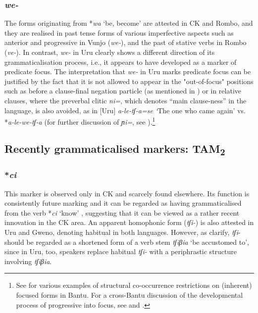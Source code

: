 \documentclass[output=paper]{langscibook}
\begin{document}
\subsubsection{\textit{we-}}\label{sec:shinagawa:3.1.5}

  The forms originating from *\textit{wa} ‘be, become’ are attested in CK and Rombo, and they are realised in past tense forms of various imperfective aspects such as anterior and progressive in Vunjo (\textit{we-}), and the past of stative verbs in Rombo (\textit{ve-}). In contrast, \textit{we-} in Uru clearly shows a different direction of its grammaticalisation process, i.e., it appears to have developed as a marker of predicate focus. The interpretation that \textit{we-} in Uru marks predicate focus can be justified by the fact that it is not allowed to appear in the "out-of-focus" positions such as before a clause-final negation particle (as mentioned in ) or in relative clauses, where the preverbal clitic \textit{ni=}, which denotes “main clause-ness” in the language, is also avoided, as in [Uru] \textit{a-le-tʃ-a=se ‘}The one who came again’ vs. *\textit{a-le-we-tʃ-a} (for further discussion of \textit{ɲi=}, see \citealt{ShinagawaForthcoming-b}).\footnote{See \citet{HymanWatters1984} for various examples of structural co-occurrence restrictions on (inherent) focused forms in Bantu. For a cross-Bantu discussion of the developmental process of progressive into focus, see \citet{Güldemann2003} and \citet{Gibson2019}.}

\subsection{Recently grammaticalised markers: TAM\textsubscript{2}}\label{sec:shinagawa:3.2}
\subsubsection{*\textit{ci}}\label{sec:shinagawa:3.2.1}

  This marker is observed only in CK and scarcely found elsewhere. Its function is consistently future marking and it can be regarded as having grammaticalised from the verb *\textit{ci} ‘know’ \citep[76]{Nurse2003a}, suggesting that it can be viewed as a rather recent innovation in the CK area. An apparent homophonic form (\textit{tʃi-}) is also attested in Uru and Gweno, denoting habitual in both languages. However, as  \citet[255]{PhilippsonNurse2000} clarify, \textit{tʃi}{}- should be regarded as a shortened form of a verb stem \textit{tʃiβia} ‘be accustomed to’, since in Uru, too, speakers replace habitual \textit{tʃi-} with a periphrastic structure involving \textit{tʃiβia}.
\end{document}
